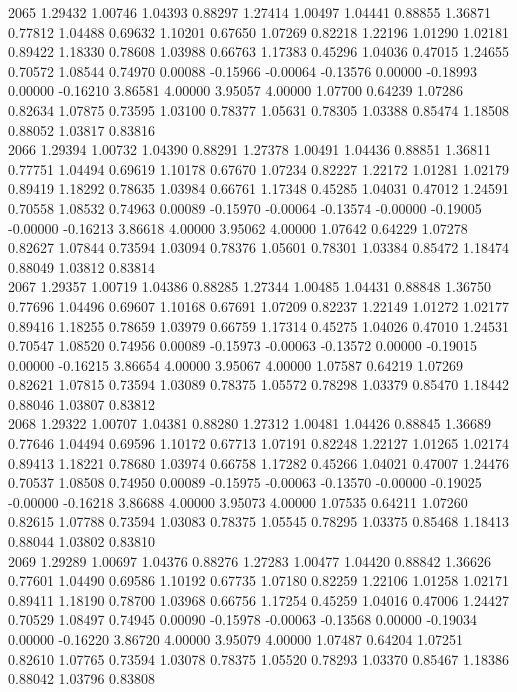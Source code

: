 {2065 1.29432 1.00746 1.04393 0.88297 1.27414 1.00497 1.04441 0.88855 1.36871 0.77812 1.04488 0.69632 1.10201 0.67650 1.07269 0.82218 1.22196 1.01290 1.02181 0.89422 1.18330 0.78608 1.03988 0.66763 1.17383 0.45296 1.04036 0.47015 1.24655 0.70572 1.08544 0.74970 0.00088 -0.15966 -0.00064 -0.13576 0.00000 -0.18993 0.00000 -0.16210 3.86581 4.00000 3.95057 4.00000 1.07700 0.64239 1.07286 0.82634 1.07875 0.73595 1.03100 0.78377 1.05631 0.78305 1.03388 0.85474 1.18508 0.88052 1.03817 0.83816 \\
2066 1.29394 1.00732 1.04390 0.88291 1.27378 1.00491 1.04436 0.88851 1.36811 0.77751 1.04494 0.69619 1.10178 0.67670 1.07234 0.82227 1.22172 1.01281 1.02179 0.89419 1.18292 0.78635 1.03984 0.66761 1.17348 0.45285 1.04031 0.47012 1.24591 0.70558 1.08532 0.74963 0.00089 -0.15970 -0.00064 -0.13574 -0.00000 -0.19005 -0.00000 -0.16213 3.86618 4.00000 3.95062 4.00000 1.07642 0.64229 1.07278 0.82627 1.07844 0.73594 1.03094 0.78376 1.05601 0.78301 1.03384 0.85472 1.18474 0.88049 1.03812 0.83814 \\
2067 1.29357 1.00719 1.04386 0.88285 1.27344 1.00485 1.04431 0.88848 1.36750 0.77696 1.04496 0.69607 1.10168 0.67691 1.07209 0.82237 1.22149 1.01272 1.02177 0.89416 1.18255 0.78659 1.03979 0.66759 1.17314 0.45275 1.04026 0.47010 1.24531 0.70547 1.08520 0.74956 0.00089 -0.15973 -0.00063 -0.13572 0.00000 -0.19015 0.00000 -0.16215 3.86654 4.00000 3.95067 4.00000 1.07587 0.64219 1.07269 0.82621 1.07815 0.73594 1.03089 0.78375 1.05572 0.78298 1.03379 0.85470 1.18442 0.88046 1.03807 0.83812 \\
2068 1.29322 1.00707 1.04381 0.88280 1.27312 1.00481 1.04426 0.88845 1.36689 0.77646 1.04494 0.69596 1.10172 0.67713 1.07191 0.82248 1.22127 1.01265 1.02174 0.89413 1.18221 0.78680 1.03974 0.66758 1.17282 0.45266 1.04021 0.47007 1.24476 0.70537 1.08508 0.74950 0.00089 -0.15975 -0.00063 -0.13570 -0.00000 -0.19025 -0.00000 -0.16218 3.86688 4.00000 3.95073 4.00000 1.07535 0.64211 1.07260 0.82615 1.07788 0.73594 1.03083 0.78375 1.05545 0.78295 1.03375 0.85468 1.18413 0.88044 1.03802 0.83810 \\
2069 1.29289 1.00697 1.04376 0.88276 1.27283 1.00477 1.04420 0.88842 1.36626 0.77601 1.04490 0.69586 1.10192 0.67735 1.07180 0.82259 1.22106 1.01258 1.02171 0.89411 1.18190 0.78700 1.03968 0.66756 1.17254 0.45259 1.04016 0.47006 1.24427 0.70529 1.08497 0.74945 0.00090 -0.15978 -0.00063 -0.13568 0.00000 -0.19034 0.00000 -0.16220 3.86720 4.00000 3.95079 4.00000 1.07487 0.64204 1.07251 0.82610 1.07765 0.73594 1.03078 0.78375 1.05520 0.78293 1.03370 0.85467 1.18386 0.88042 1.03796 0.83808 \\
}

